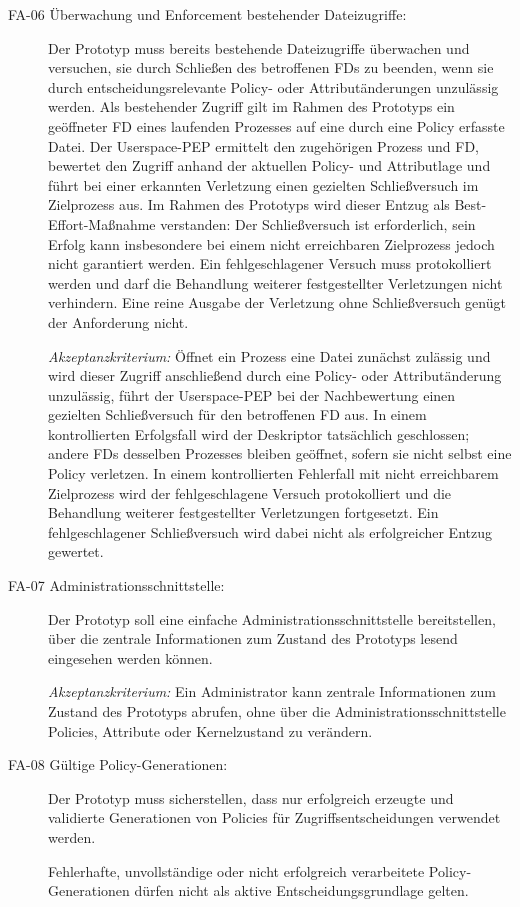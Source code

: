 \begin{description}
    \item[FA-06 Überwachung und Enforcement bestehender Dateizugriffe:]
    Der Prototyp muss bereits bestehende Dateizugriffe überwachen und versuchen, sie durch Schließen des betroffenen FDs zu beenden, wenn sie durch entscheidungsrelevante Policy- oder Attributänderungen unzulässig werden.
    Als bestehender Zugriff gilt im Rahmen des Prototyps ein geöffneter FD eines laufenden Prozesses auf eine durch eine Policy erfasste Datei.
    Der Userspace-PEP ermittelt den zugehörigen Prozess und FD, bewertet den Zugriff anhand der aktuellen Policy- und Attributlage und führt bei einer erkannten Verletzung einen gezielten Schließversuch im Zielprozess aus.
    Im Rahmen des Prototyps wird dieser Entzug als Best-Effort-Maßnahme verstanden: Der Schließversuch ist erforderlich, sein Erfolg kann insbesondere bei einem nicht erreichbaren Zielprozess jedoch nicht garantiert werden. Ein fehlgeschlagener Versuch muss protokolliert werden und darf die Behandlung weiterer festgestellter Verletzungen nicht verhindern.
    Eine reine Ausgabe der Verletzung ohne Schließversuch genügt der Anforderung nicht.

    \textit{Akzeptanzkriterium:} Öffnet ein Prozess eine Datei zunächst zulässig und wird dieser Zugriff anschließend durch eine Policy- oder Attributänderung unzulässig, führt der Userspace-PEP bei der Nachbewertung einen gezielten Schließversuch für den betroffenen FD aus. In einem kontrollierten Erfolgsfall wird der Deskriptor tatsächlich geschlossen; andere FDs desselben Prozesses bleiben geöffnet, sofern sie nicht selbst eine Policy verletzen. In einem kontrollierten Fehlerfall mit nicht erreichbarem Zielprozess wird der fehlgeschlagene Versuch protokolliert und die Behandlung weiterer festgestellter Verletzungen fortgesetzt. Ein fehlgeschlagener Schließversuch wird dabei nicht als erfolgreicher Entzug gewertet.

    \item[FA-07 Administrationsschnittstelle:]
    Der Prototyp soll eine einfache Administrationsschnittstelle bereitstellen, über die zentrale Informationen zum Zustand des Prototyps lesend eingesehen werden können.
    
    \textit{Akzeptanzkriterium:} Ein Administrator kann zentrale Informationen zum Zustand des Prototyps abrufen, ohne über die Administrationsschnittstelle Policies, Attribute oder Kernelzustand zu verändern.

    \item[FA-08 Gültige Policy-Generationen:]
    \hypertarget{anf:gueltige-policy-generationen}{Der Prototyp muss sicherstellen, dass nur erfolgreich erzeugte und validierte Generationen von Policies für Zugriffsentscheidungen verwendet werden.}
    Fehlerhafte, unvollständige oder nicht erfolgreich verarbeitete Policy-Generationen dürfen nicht als aktive Entscheidungsgrundlage gelten.
    

\end{description}
